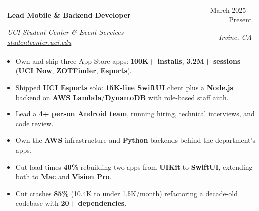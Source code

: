 \documentclass[letterpaper,11pt]{article}
\makeatletter
\newcommand{\resumeItem}[1]{
  \item\small{
    {#1\vspace{-3pt}}
  }
}
\newcommand{\resumeSubheading}[4]{
  \vspace{-2pt}\item
    \begin{tabular*}{0.97\textwidth}[t]{l@{\extracolsep{\fill}}r}
      \textbf{#1} & #2 \\
      \textit{\small#3} & \textit{\small #4} \\
    \end{tabular*}\vspace{-5pt}
}
\newcommand{\resumeItemListStart}{\begin{itemize}}
\newcommand{\resumeItemListEnd}{\end{itemize}\vspace{-3pt}}
\makeatother
\begin{document}
  \resumeSubheading
    {Lead Mobile \& Backend Developer}{March 2025 -- Present}
    {UCI Student Center \& Event Services $|$ \href{https://studentcenter.uci.edu/home/download-the-apps/}{studentcenter.uci.edu}}{Irvine, CA}
    \resumeItemListStart
      \resumeItem{Own and ship three App Store apps: \textbf{100K+ installs}, \textbf{3.2M+ sessions} (\href{https://apps.apple.com/us/app/uci-now/id1382415698}{\textbf{UCI Now}}, \href{https://apps.apple.com/us/app/zotfinder/id915256719}{\textbf{ZOTFinder}}, \href{https://apps.apple.com/us/app/uci-esports/id6751213697}{\textbf{Esports}}).}
      \resumeItem{Shipped \textbf{UCI Esports} solo: \textbf{15K-line SwiftUI} client plus a \textbf{Node.js} backend on \textbf{AWS Lambda}/\textbf{DynamoDB} with role-based staff auth.}
      \resumeItem{Lead a \textbf{4+ person Android team}, running hiring, technical interviews, and code review.}
      \resumeItem{Own the \textbf{AWS} infrastructure and \textbf{Python} backends behind the department's apps.}
      \resumeItem{Cut load times \textbf{40\%} rebuilding two apps from \textbf{UIKit} to \textbf{SwiftUI}, extending both to \textbf{Mac} and \textbf{Vision Pro}.}
      \resumeItem{Cut crashes \textbf{85\%} (10.4K to under 1.5K/month) refactoring a decade-old codebase with \textbf{20+ dependencies}.}
    \resumeItemListEnd

\end{document}
